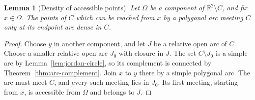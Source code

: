 \documentclass[11pt]{article}
\theoremstyle{mainplain}
\newtheorem{lemma}[theorem]{Lemma}
\theoremstyle{mainroman}
\theoremstyle{definition}
\numberwithin{equation}{section}
\begin{document}
\begin{lemma}[Density of accessible points]\label{lem:accessible-dense}
Let $\Omega$ be a component of $\mathbb R^2\setminus C$, and fix
$x\in\Omega$. The points of $C$ which can be reached from $x$ by a
polygonal arc meeting $C$ only at its endpoint are dense in $C$.
\end{lemma}
\begin{proof}
Choose $y$ in another component, and let $J$ be a relative open arc of
$C$. Choose a smaller relative open arc $J_0$ with
closure in $J$. The set $C\setminus J_0$ is a simple arc by
Lemma~\ref{lem:jordan-circle}, so its
complement is connected by Theorem~\ref{thm:arc-complement}. Join $x$ to $y$
there by a simple polygonal arc. The arc must meet $C$, and every such
meeting lies in $J_0$. Its first meeting, starting from $x$, is
accessible from $\Omega$ and belongs to $J$.
\end{proof}
\end{document}
